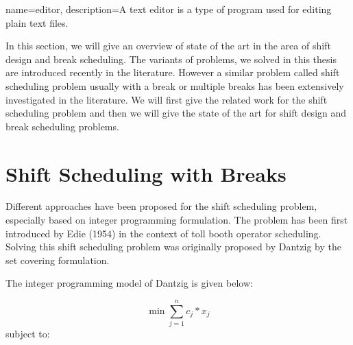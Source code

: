 %
%
%
%



{
  name={editor},
  description={A text editor is a type of program used for editing plain text files.}
}


In this section, we will give an overview of state of the art in the area of shift design and break scheduling. The variants of problems, we solved in this thesis are introduced recently in the literature. However a similar problem called shift scheduling problem usually with a break or multiple breaks has been extensively investigated in the literature. We will first give the related work for the shift scheduling problem and then we will give the state of the art for shift design and break scheduling problems.

\section{Shift Scheduling with Breaks}

Different approaches have been proposed for the shift scheduling problem, especially based on integer programming formulation. The problem has been first introduced by Edie (1954) \cite{li:1954:edie} in the context of toll booth operator scheduling. Solving this shift scheduling problem was originally proposed by Dantzig  \cite{li:1954:dantzig} by the set covering formulation. 

The integer programming model of Dantzig is given below:

\begin{equation}
\min \sum_{j=1}^n c_j * x_j
\end{equation}
subject to:


